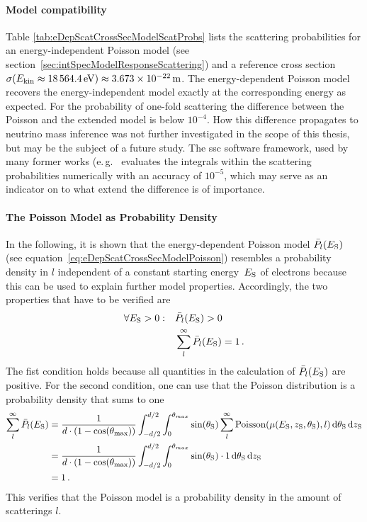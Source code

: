 \paragraph{Model compatibility}
Table \ref{tab:eDepScatCrossSecModelScatProbs} lists the scattering probabilities for an energy-independent Poisson model (see section~\ref{sec:intSpecModelResponseScattering}) and a reference cross section $\sigma(E_\mathrm{kin}\approx\SI{18564.4}{eV})\approx\SI{3.673e-22}{m}$. The energy-dependent Poisson model recovers the energy-independent model exactly at the corresponding energy as expected. For the probability of one-fold scattering the difference between the Poisson and the extended model is below $10^{-4}$. How this difference propagates to neutrino mass inference was not further investigated in the scope of this thesis, but may be the subject of a future study. The \gls{ssc} software framework, used by many former works (e.\,g.~\cite{Groh2015,Kleesiek2014,SeitzM2019} evaluates the integrals within the scattering probabilities numerically with an accuracy of $10^{-5}$, which may serve as an indicator on to what extend the difference is of importance.

\paragraph{The Poisson Model as Probability Density}
In the following, it is shown that the energy-dependent Poisson model $\bar{P}_l(E_\mathrm{S})$ (see equation~\ref{eq:eDepScatCrossSecModelPoisson}) resembles a probability density in $l$ independent of a constant starting energy~$E_\mathrm{S}$ of electrons because this can be used to explain further model properties. Accordingly, the two properties that have to be verified are
\begin{align}
	\forall E_\mathrm{S} > 0: \quad
	&\bar{P}_l(E_\mathrm{S}) > 0 \\
	&\sum_{l}^{\infty} \bar{P}_l(E_\mathrm{S}) = 1
	\text{\,.}
\end{align}
The fist condition holds because all quantities in the calculation of $\bar{P}_l(E_\mathrm{S})$ are positive. For the second condition, one can use that the Poisson distribution is a probability density that sums to one
\begin{align*}
	\sum_{l}^{\infty} \bar{P}_l(E_\mathrm{S}) &=
	\frac{1}{d \cdot (1-\cos(\theta_\mathrm{max}))} 
	\int_{-d/2}^{d/2}  
	\int_{0}^{\theta_{max}} 
	\sin(\theta_\mathrm{S})
		\sum_{l}^{\infty}
		\mathrm{Poisson}(\mu(E_\mathrm{S},z_\mathrm{S},\theta_\mathrm{S}),l)
	\mathop{}\!\mathrm{d}\theta_\mathrm{S}
	\mathop{}\!\mathrm{d}z_\mathrm{S} \\  &=
	\frac{1}{d \cdot (1-\cos(\theta_\mathrm{max}))} 
	\int_{-d/2}^{d/2}  
	\int_{0}^{\theta_{max}} 
	\sin(\theta_\mathrm{S})
		\cdot 1
	\mathop{}\!\mathrm{d}\theta_\mathrm{S}
	\mathop{}\!\mathrm{d}z_\mathrm{S} \\ &= 1
	\text{\,.}
\end{align*}
This verifies that the Poisson model is a probability density in the amount of scatterings $l$.

